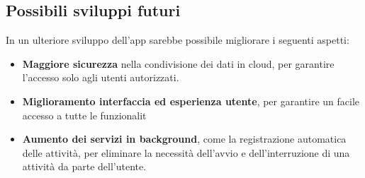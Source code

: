 \documentclass{article}
\begin{document}
\subsection*{Possibili sviluppi futuri}
In un ulteriore sviluppo dell'app sarebbe possibile migliorare i seguenti aspetti:
\begin{itemize}
    \renewcommand{\labelitemi}{-}
    \item \textbf{Maggiore sicurezza} nella condivisione dei dati in cloud, per garantire l'accesso solo agli utenti autorizzati.
    \item \textbf{Miglioramento interfaccia ed esperienza utente}, per garantire un facile accesso a tutte le funzionalit
    \item \textbf{Aumento dei servizi in background}, come la registrazione automatica delle attività, per eliminare la necessità dell'avvio e dell'interruzione di una attività da parte dell'utente.
\end{itemize}
\end{document}
